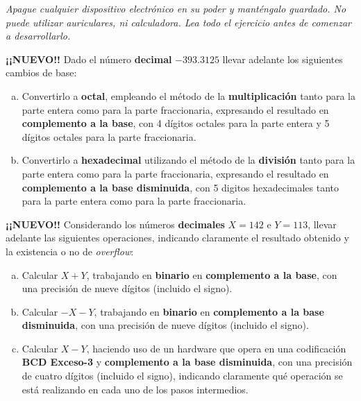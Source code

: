 \documentclass[12pt,a4paper]{article}
\begin{document}

\begin{centering}
\emph{Apague cualquier dispositivo electrónico en su poder y manténgalo guardado. No puede utilizar auriculares, ni calculadora. Lea todo el ejercicio antes de comenzar a desarrollarlo.}	
\end{centering}

 \textbf{¡¡NUEVO!!} Dado el número \textbf{decimal} $-393.3125$ llevar adelante los siguientes cambios de base:
\begin{enumerate}[a)]
	\item Convertirlo a \textbf{octal}, empleando el método de la \textbf{multiplicación} tanto para la parte entera como para la parte fraccionaria, expresando el resultado en \textbf{complemento a la base}, con 4 dígitos octales para la parte entera y 5 dígitos octales para la parte fraccionaria.

	\item Convertirlo a \textbf{hexadecimal} utilizando el método de la \textbf{división} tanto para la parte entera como para la parte fraccionaria, expresando el resultado en \textbf{complemento a la base disminuida}, con 5 digitos hexadecimales tanto para la parte entera como para la parte fraccionaria.
\end{enumerate}

 \textbf{¡¡NUEVO!!} Considerando los números {\textbf{decimales}} $X = 142$ e $Y = 113$, llevar adelante las siguientes operaciones, indicando claramente el resultado obtenido y la existencia o no de \emph{overflow}:
\begin{enumerate}[a)]
	\item Calcular $X + Y$, trabajando en \textbf{binario} en \textbf{complemento a la base}, con una precisión de nueve dígitos (incluido el signo).
	\item Calcular $ - X - Y $, trabajando en \textbf{binario} en \textbf{complemento a la base disminuida}, con una precisión de nueve dígitos (incluido el signo).
	\item Calcular $X - Y$, haciendo uso de un hardware que opera en una codificación \textbf{BCD Exceso-3} y \textbf{complemento a la base disminuida}, con una precisión de cuatro dígitos (incluido el signo), indicando claramente qué operación se está realizando en cada uno de los pasos intermedios.
\end{enumerate}
\end{document}
